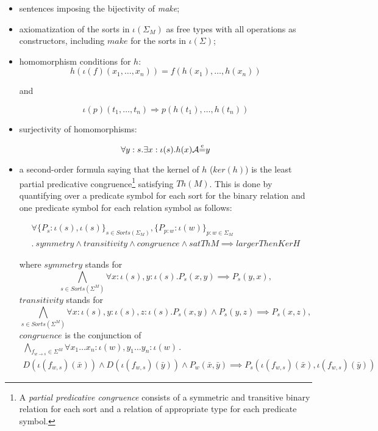 \begin{itemize}

\item
sentences imposing the bijectivity of \textit{make};

\item axiomatization of the sorts in $\iota(\Sigma_M)$ as free types
with all operations as constructors, including $\mathit{make}$ for the sorts
in $\iota(\Sigma)$;

\item homomorphism conditions for $h$:
 $$ h(\iota(f)(x_1, \dots, x_n)) = f(h(x_1), \dots, h(x_n)) $$
 
and

$$\iota(p)(t_1, \dots, t_n) \Rightarrow p(h(t_1), \dots, h(t_n))$$

\item surjectivity of homomorphisms:

$$\forall y : s . \exists x:\iota(s) . h(x) \mathcal{A}{\stackrel{e}{=}} y$$

\item a second-order formula saying that the kernel of $h$ ($\mathit{ker}(h)$)
is the least partial predicative congruence\footnote
{A \emph{partial predicative congruence} consists of a symmetric 
and transitive binary relation for each sort and a relation
of appropriate type for each predicate symbol.} satisfying
$Th(M)$. This is done by quantifying over a predicate symbol for each sort
for the binary relation and one predicate symbol for each relation symbol
as follows: 

$$\begin{array}{l}
 \forall \{P_s : \iota(s),  \iota(s)\}_{s \in Sorts(\Sigma_M)} ,
           \{P_{p:w} : \iota(w)\} _{p:w \in \Sigma_M} \\
 .~ 
\mathit{symmetry}
 \land \mathit{transitivity}
 \land  \mathit{congruence}
\land \mathit{satThM}
\implies \mathit{largerThenKerH}
\end{array}
$$

where $\mathit{symmetry}$ stands for
$$\bigwedge_{s\in Sorts(\Sigma^M)} \forall x:{\iota(s)},y:{\iota(s)}.P_s(x,y)\implies P_s(y, x),$$
$\mathit{transitivity}$ stands for
$$\bigwedge_{s\in Sorts(\Sigma^M)} \forall x:{\iota(s)},y:{\iota(s)},z:{\iota(s)}.P_s(x, y)\land P_s(y, z)\implies P_s(x, z),$$
$\mathit{congruence}$ is the conjunction of
$$
\begin{array}{l}
\bigwedge_{f_{w\rightarrow s}\in\Sigma^M} \forall x_1\ldots x_n:{\iota(w)},y_1\ldots y_n:{\iota(w)}\,.\,\,\\
D(\iota(f_{w,s})(\bar{x}))\land D(\iota(f_{w,s})(\bar{y}))\land P_w(\bar{x},\bar{y})
\implies P_s(\iota(f_{w,s})(\bar{x}),\iota(f_{w,s})(\bar{y}))
\end{array}
$$ 


\end{itemize}
